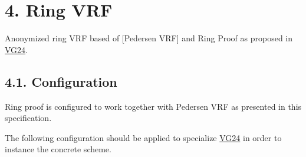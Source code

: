 \documentclass[
]{article}
\begin{document}
\section{4. Ring VRF}\label{ring-vrf}

Anonymized ring VRF based of {[}Pedersen VRF{]} and Ring Proof as
proposed in \href{https://github.com/davxy/ring-proof-spec}{VG24}.

\subsection{4.1. Configuration}\label{configuration-2}

Ring proof is configured to work together with Pedersen VRF as presented
in this specification.

The following configuration should be applied to specialize
\href{https://github.com/davxy/ring-proof-spec}{VG24} in order to
instance the concrete scheme.
\end{document}
